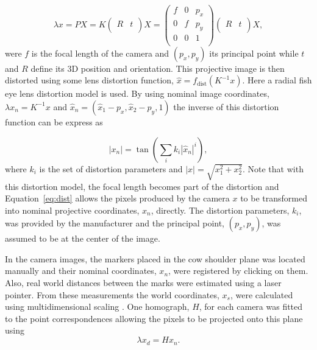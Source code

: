 \documentclass{IET}
\begin{document}
\begin{equation}
	\lambda x = P X = K \left(
	\begin{array}{cc}
		R & t \\
	\end{array}
	\right) X = 
	\left(
	\begin{array}{ccc}
		f & 0 & p_x  \\
		0 & f & p_y  \\
		0 & 0 & 1  \\
	\end{array}
	\right)
	\left(
	\begin{array}{cc}
		R & t \\
	\end{array}
	\right) X,	
\end{equation} 
were $f$ is the focal length of the camera and $\left(p_x, p_y\right)$ its principal point while $t$ and $R$  define its 3D position and orientation. This projective image is then distorted using some lens distortion function, $\hat x = f_\text{dist}\left(K^{-1}x\right)$. Here a radial fish eye lens distortion model is used. By using nominal image coordinates, $\lambda x_n = K^{-1} x$ and $\hat x_n = \left(\hat x_1 - p_x, \hat x_2 - p_y, 1\right)$ the inverse of this distortion function can be express as 

\begin{equation}
	\left| x_n \right| = \tan \left( \sum_i k_i \left| \hat x_n \right|^i \right)
	\label{eq:dist} ,
\end{equation}
where $k_i$ is the set of distortion parameters and 
$\left| x \right| = \sqrt{x_1^2 + x_2^2}$.
Note that with this distortion model, the focal length becomes part of the distortion and Equation~\ref{eq:dist} allows the pixels produced by the camera $x$ to be transformed into nominal projective coordinates, $x_n$, directly. The distortion parameters, $k_i$, was provided by the manufacturer and the principal point, $\left(p_x, p_y\right)$,  was assumed to be at the center of the image.

In the camera images, the markers placed in the cow shoulder plane was located manually and their nominal coordinates, $x_n$, were registered by clicking on them. Also, real world distances between the marks were estimated using a laser pointer. From these measurements the world coordinates, $x_s$, were calculated using multidimensional scaling \cite{Young1938}. One homograph, $H$, for each camera was fitted to the point correspondences allowing the pixels to be projected onto this plane using 
\begin{equation}
\lambda x_d = H x_n .
\end{equation}
\end{document}
